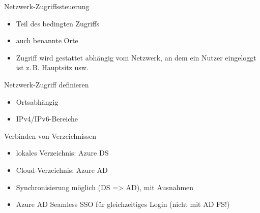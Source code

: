 
\begin{flashcard}[Definition]{Netzwerk-Zugriffssteuerung}
  \begin{itemize}
    \item Teil des bedingten Zugriffs
    \item auch benannte Orte
    \item Zugriff wird gestattet abhängig vom Netzwerk, an dem ein Nutzer eingeloggt ist\newline
      z.\,B. Hauptsitz usw.
  \end{itemize}
\end{flashcard}

\begin{flashcard}[Definition]{Netzwerk-Zugriff definieren}
  \begin{itemize}
    \item Ortsabhängig
    \item IPv4/IPv6-Bereiche
  \end{itemize}
\end{flashcard}


\begin{flashcard}[Definition]{Verbinden von Verzeichnissen}
  \begin{itemize}
    \item lokales Verzeichnis: Azure DS
    \item Cloud-Verzeichnis: Azure AD
    \item Synchronisierung möglich (DS => AD), mit Ausnahmen
    \item Azure AD Seamless SSO für gleichzeitiges Login (nicht mit AD FS!)
  \end{itemize}
\end{flashcard}

